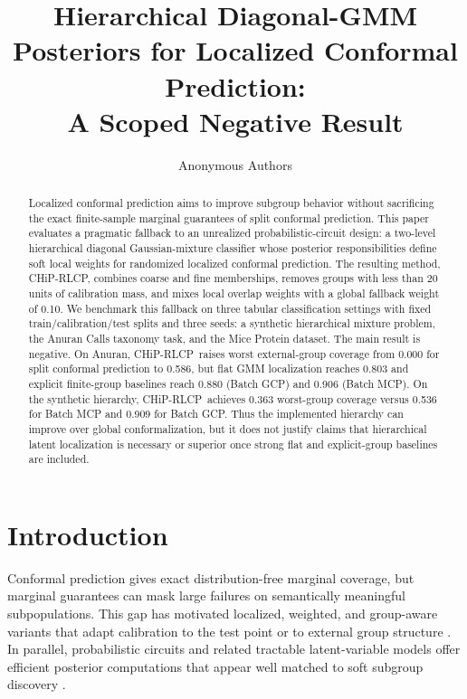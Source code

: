 \documentclass{article}
\title{Hierarchical Diagonal-GMM Posteriors for Localized Conformal Prediction:\\A Scoped Negative Result}
\author{Anonymous Authors}
\newcommand{\chip}{CHiP-RLCP}
\begin{document}
\maketitle

\begin{abstract}
Localized conformal prediction aims to improve subgroup behavior without sacrificing the exact finite-sample marginal guarantees of split conformal prediction. This paper evaluates a pragmatic fallback to an unrealized probabilistic-circuit design: a two-level hierarchical diagonal Gaussian-mixture classifier whose posterior responsibilities define soft local weights for randomized localized conformal prediction. The resulting method, \chip, combines coarse and fine memberships, removes groups with less than 20 units of calibration mass, and mixes local overlap weights with a global fallback weight of 0.10. We benchmark this fallback on three tabular classification settings with fixed train/calibration/test splits and three seeds: a synthetic hierarchical mixture problem, the Anuran Calls taxonomy task, and the Mice Protein dataset. The main result is negative. On Anuran, \chip\ raises worst external-group coverage from 0.000 for split conformal prediction to 0.586, but flat GMM localization reaches 0.803 and explicit finite-group baselines reach 0.880 (Batch GCP) and 0.906 (Batch MCP). On the synthetic hierarchy, \chip\ achieves 0.363 worst-group coverage versus 0.536 for Batch MCP and 0.909 for Batch GCP. Thus the implemented hierarchy can improve over global conformalization, but it does not justify claims that hierarchical latent localization is necessary or superior once strong flat and explicit-group baselines are included.
\end{abstract}

\section{Introduction}
Conformal prediction gives exact distribution-free marginal coverage, but marginal guarantees can mask large failures on semantically meaningful subpopulations. This gap has motivated localized, weighted, and group-aware variants that adapt calibration to the test point or to external group structure \citep{guan2023localized,han2022splitlocalized,hore2025localweights,jung2022batch,bairaktari2025kandinsky,zhang2024posterior,plassier2025probabilistic}. In parallel, probabilistic circuits and related tractable latent-variable models offer efficient posterior computations that appear well matched to soft subgroup discovery \citep{poon2011sumproduct,ventola2023pcsknow,kang2024colep}.
\end{document}
